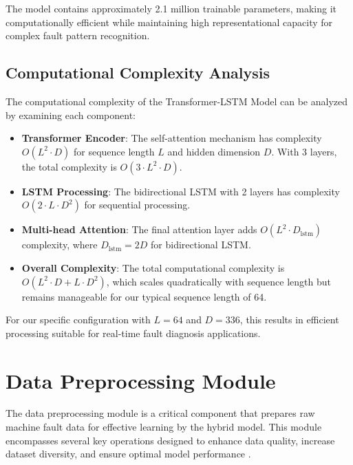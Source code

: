 The model contains approximately 2.1 million trainable parameters, making it computationally efficient while maintaining high representational capacity for complex fault pattern recognition.

\subsection{Computational Complexity Analysis}
\label{subsec:complexity_analysis}

The computational complexity of the Transformer-LSTM Model can be analyzed by examining each component:

\begin{itemize}
    \item \textbf{Transformer Encoder}: The self-attention mechanism has complexity $O(L^2 \cdot D)$ for sequence length $L$ and hidden dimension $D$. With 3 layers, the total complexity is $O(3 \cdot L^2 \cdot D)$.
    
    \item \textbf{LSTM Processing}: The bidirectional LSTM with 2 layers has complexity $O(2 \cdot L \cdot D^2)$ for sequential processing.
    
    \item \textbf{Multi-head Attention}: The final attention layer adds $O(L^2 \cdot D_{\text{lstm}})$ complexity, where $D_{\text{lstm}} = 2D$ for bidirectional LSTM.
    
    \item \textbf{Overall Complexity}: The total computational complexity is $O(L^2 \cdot D + L \cdot D^2)$, which scales quadratically with sequence length but remains manageable for our typical sequence length of 64.
\end{itemize}

For our specific configuration with $L = 64$ and $D = 336$, this results in efficient processing suitable for real-time fault diagnosis applications.

\section{Data Preprocessing Module}
\label{sec:hybrid_model:preprocessing}

The data preprocessing module is a critical component that prepares raw machine fault data for effective learning by the hybrid model. This module encompasses several key operations designed to enhance data quality, increase dataset diversity, and ensure optimal model performance \citep{liu2018artificial}.

